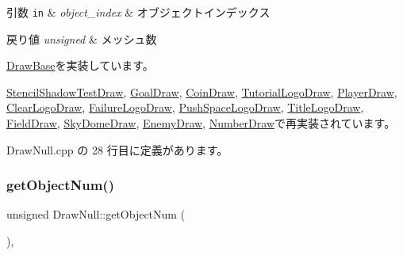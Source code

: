 \begin{DoxyParams}[1]{引数}
\mbox{\tt in}  & {\em object\+\_\+index} & オブジェクトインデックス \\
\hline
\end{DoxyParams}

\begin{DoxyRetVals}{戻り値}
{\em unsigned} & メッシュ数 \\
\hline
\end{DoxyRetVals}


\mbox{\hyperlink{class_draw_base_add488139aed539e7ccd19492702b4bee}{Draw\+Base}}を実装しています。



\mbox{\hyperlink{class_stencil_shadow_test_draw_a285b3045ff5cc34b6b2b991cca434bb3}{Stencil\+Shadow\+Test\+Draw}}, \mbox{\hyperlink{class_goal_draw_ac80c8da78cda7b15a4ce46f7d7057622}{Goal\+Draw}}, \mbox{\hyperlink{class_coin_draw_a8ebedf2582d53b40016ebd3f0e82c38e}{Coin\+Draw}}, \mbox{\hyperlink{class_tutorial_logo_draw_a0e56784e25f1f83e6ff167280b801aad}{Tutorial\+Logo\+Draw}}, \mbox{\hyperlink{class_player_draw_ac618153d70492f73299c58a50d565431}{Player\+Draw}}, \mbox{\hyperlink{class_clear_logo_draw_a257f34e6f8325580f7df835f20d2ebb4}{Clear\+Logo\+Draw}}, \mbox{\hyperlink{class_failure_logo_draw_a45bb5d0965ca73b06ae0836f27f9b0e3}{Failure\+Logo\+Draw}}, \mbox{\hyperlink{class_push_space_logo_draw_abaa66b6e3c46aa03bae21bad271eebc0}{Push\+Space\+Logo\+Draw}}, \mbox{\hyperlink{class_title_logo_draw_a20a0e0c3569e49eb421ab4b5a65777cd}{Title\+Logo\+Draw}}, \mbox{\hyperlink{class_field_draw_a0894ddd73716f0db8ceed4b7d89f23fd}{Field\+Draw}}, \mbox{\hyperlink{class_sky_dome_draw_a6b281bafa71c058ee83c373ad978e3bb}{Sky\+Dome\+Draw}}, \mbox{\hyperlink{class_enemy_draw_a1d8a943e4b625795bbd5ae614cc38ed1}{Enemy\+Draw}}, \mbox{\hyperlink{class_number_draw_abcd88040b2b6d5dd7d21e8cfd50b1682}{Number\+Draw}}で再実装されています。



 Draw\+Null.\+cpp の 28 行目に定義があります。

\mbox{\label{class_draw_null_a8bddfa6ee87e47b2ecbbe6803b088e37}} 
\subsubsection{\texorpdfstring{get\+Object\+Num()}{getObjectNum()}}
{\footnotesize\ttfamily unsigned Draw\+Null\+::get\+Object\+Num (\begin{DoxyParamCaption}{ }\end{DoxyParamCaption})\hspace{0.3cm}{\ttfamily [override]}, {\ttfamily [virtual]}}




